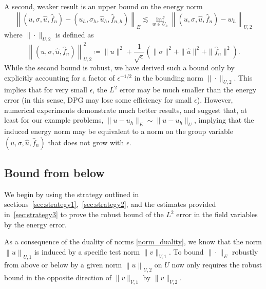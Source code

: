 \documentclass[11pt,onecolumn]{scrartcl}
\begin{document}
A second, weaker result is an upper bound on the energy norm
\[
\left\|\left(u,\sigma,\widehat{u},\widehat{f}_n\right)-\left(u_h,\sigma_h,\widehat{u}_h,\widehat{f}_{n,h}\right)\right\|_{E} \lesssim \inf_{w\in U_h}\left\|\left(u,\sigma,\widehat{u},\widehat{f}_n\right)-w_h\right\|_{U,2}
\]
where $\|\cdot \|_{U,2}$ is defined as
\[
\left\|\left(u,\sigma,\widehat{u},\widehat{f}_n\right)\right\|_{U,2}^2 \coloneqq \|u\|^2 + \frac{1}{\sqrt{\epsilon}}\left(\|\sigma\|^2 + \|\widehat{u}\|^2+ \|\widehat{f}_n\|^2\right).
\]
While the second bound is robust, we have derived such a bound only by explicitly accounting for a factor of $\epsilon^{-1/2}$ in the bounding norm $\|\cdot \|_{U,2}$.  This implies that for very small $\epsilon$, the $L^2$ error may be much smaller than the energy error (in this sense, DPG may lose some efficiency for small $\epsilon$). However, numerical experiments demonstrate much better results, and suggest that, at least for our example problems, $\|u-u_h\|_E \sim \|u-u_h\|_{U}$, implying that the induced energy norm may be equivalent to a norm on the group variable $\left(u,\sigma,\widehat{u},\widehat{f}_n\right)$ that does not grow with $\epsilon$.  

\subsection{Bound from below}

We begin by using the strategy outlined in sections~\ref{sec:strategy1},~\ref{sec:strategy2}, and the estimates provided in~\ref{sec:strategy3} to prove the robust bound of the $L^2$ error in the field variables by the energy error.  

As a consequence of the duality of norms \eqref{norm_duality}, we know that the norm $\left\| u \right\|_{U,1}$ is induced by a specific test norm $\| v  \|_{V,1}$.  To bound $\|\cdot\|_E$ robustly from above or below by a given norm $\left\| u \right\|_{U,2}$ on $U$ now only requires the robust bound in the opposite direction of $\| v \|_{V,1}$ by $\|v\|_{V,2}$. 
\end{document}
